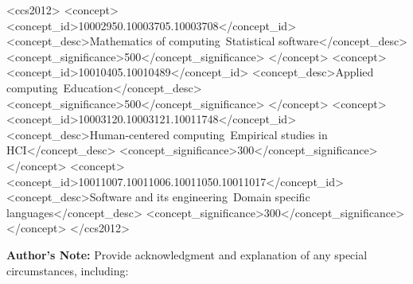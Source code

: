 \documentclass[acmsmall]{acmart}
\begin{document}
%


\begin{CCSXML}
<ccs2012>
<concept>
<concept_id>10002950.10003705.10003708</concept_id>
<concept_desc>Mathematics of computing~Statistical software</concept_desc>
<concept_significance>500</concept_significance>
</concept>
<concept>
<concept_id>10010405.10010489</concept_id>
<concept_desc>Applied computing~Education</concept_desc>
<concept_significance>500</concept_significance>
</concept>
<concept>
<concept_id>10003120.10003121.10011748</concept_id>
<concept_desc>Human-centered computing~Empirical studies in HCI</concept_desc>
<concept_significance>300</concept_significance>
</concept>
<concept>
<concept_id>10011007.10011006.10011050.10011017</concept_id>
<concept_desc>Software and its engineering~Domain specific languages</concept_desc>
<concept_significance>300</concept_significance>
</concept>
</ccs2012>
\end{CCSXML}



%


%
\maketitle

\textbf{Author's Note:} Provide acknowledgment and explanation of any special circumstances, including:
\end{document}
